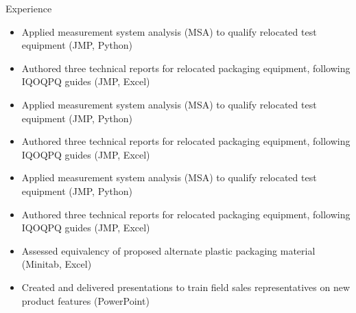 \documentclass{resume} %
\begin{document}
\begin{workSection}{Experience}
    \experienceItem[
        company=VA Intelligence,
        location=Phoenix{,} AZ,
        position=Research \& Dev Development Intern,
        duration=May 2019 – Aug 2019
    ]
     \begin{itemize}
        \itemsep -6pt {} 
        \item Applied measurement system analysis (MSA) to qualify relocated test equipment (JMP, Python)
        \item Authored three technical reports for relocated packaging equipment, following IQOQPQ guides (JMP, Excel)
     \end{itemize}
     
    \experienceItem[
        company=AAA dev,
        location=Phoenix{,} AZ,
        position=Research \& Dev Development Intern,
        duration=May 2019 – Aug 2019
    ]
     \begin{itemize}
        \itemsep -6pt {} 
        \item Applied measurement system analysis (MSA) to qualify relocated test equipment (JMP, Python)
        \item Authored three technical reports for relocated packaging equipment, following IQOQPQ guides (JMP, Excel)
     \end{itemize}
     
    \experienceItem[
        company=B-stock,
        location=Phoenix{,} AZ,
        position=Research \& Dev Development Intern,
        duration=May 2019 – Aug 2019
    ]
     \begin{itemize}
        \itemsep -6pt {} 
        \item Applied measurement system analysis (MSA) to qualify relocated test equipment (JMP, Python)
        \item Authored three technical reports for relocated packaging equipment, following IQOQPQ guides (JMP, Excel)
     \end{itemize}
     
    \experienceItem[
        company=Vnesheconombank,
        location=Scottsdale{,} AZ,
        position=Quality Engineering Intern,
        duration=May 2018 – Aug 2018
    ]
    \begin{itemize}
        \itemsep -6pt {} 
        \item Assessed equivalency of proposed alternate plastic packaging material (Minitab, Excel)
        \item Created and delivered presentations to train field sales representatives on new product features (PowerPoint)
     \end{itemize}
     
\end{workSection}
\end{document}
